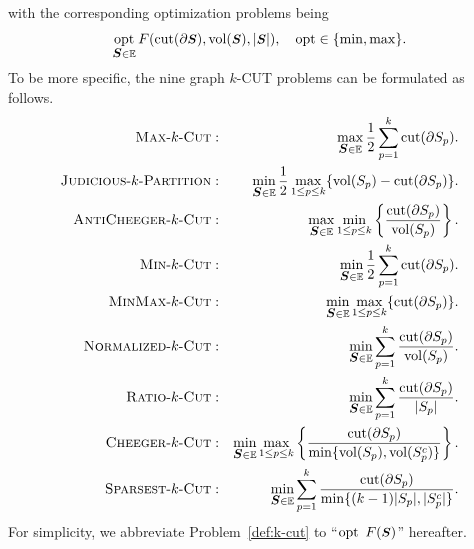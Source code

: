\documentclass[12pt, a4paper]{article}%
\DeclareMathOperator*{\opt}{\ensuremath{opt}}
\renewcommand{\vec}[1]{\mbox{\boldmath \small $#1$}}
\newcommand{\cut}{\mathrm{cut}}
\newcommand{\vol}{\mathrm{vol}}
\numberwithin{equation}{section}
\theoremstyle{plain}
\begin{document}
	with the corresponding optimization problems being 
	\begin{equation}
		\label{def:k-cut}
		\opt\limits_{\vec S\in\mathbb{E}} F(\cut(\partial \vec S),\vol(\vec S),|\vec S|), \quad \opt\in\{\min,\max\}.
	\end{equation}
	To be more specific, the nine graph $k$-CUT problems can be formulated as follows.
	\begin{align}
		\text{\textsc{Max}-$k$-\textsc{Cut}}&:&\max_{\vec S\in\mathbb{E}} \frac{1}{2}\sum_{p=1}^k \cut(\partial S_p).\label{eq::max-k-cut}\\
		\text{\textsc{Judicious}-$k$-\textsc{Partition}}&:&\min_{\vec S\in\mathbb{E}} \frac{1}{2}\max_{1\leq p\leq k} \{\vol(S_p)-\cut(\partial S_p)\}.\label{eq::jp-k-cut}\\
		\text{\textsc{AntiCheeger}-$k$-\textsc{Cut}}&: &\max_{\vec S\in\mathbb{E}}\min_{1\leq p\leq k}\left\{\frac{\cut(\partial S_p)}{\vol(S_p)}\right\}.\label{eq::ah-k-cut}\\
		\text{\textsc{Min}-$k$-\textsc{Cut}}&:&\min_{\vec S\in\mathbb{E}} \frac{1}{2}\sum_{p=1}^k \cut(\partial S_p).\label{eq::min-k-cut}\\
		\text{\textsc{MinMax}-$k$-\textsc{Cut}}&:&\min_{\vec S\in\mathbb{E}} \max_{1\leq p\leq k} \{\cut(\partial S_p)\}.\label{eq::minmax-k-cut}\\
		\text{\textsc{Normalized}-$k$-\textsc{Cut}}&:&\min_{\vec S\in\mathbb{E}}\sum_{p=1}^k \frac{\cut(\partial S_p)}{\vol(S_p)}.\label{eq::normalized-k-cut}\\
		\text{\textsc{Ratio}-$k$-\textsc{Cut}}&:&\min_{\vec S\in\mathbb{E}}\sum_{p=1}^k \frac{\cut(\partial S_p)}{|S_p|}.\label{eq::ratio-k-cut}\\
		\text{\textsc{Cheeger}-$k$-\textsc{Cut}}&:&\min_{\vec S\in\mathbb{E}}\max_{1\leq p\leq k} \left\{\frac{\cut(\partial S_p)}{\min\{\vol(S_p),\vol(S_p^c)\}}\right\}.\label{eq::cheeger}\\
		\text{\textsc{Sparsest}-$k$-\textsc{Cut}}&:&\min_{\vec S\in\mathbb{E}}\sum_{p=1}^k \frac{\cut(\partial S_p)}{\min\{(k-1)|S_p|,|S_p^c|\}}.\label{eq::sparsest}
	\end{align}
	For simplicity, we abbreviate Problem~\eqref{def:k-cut} to ``$\opt\,\, F(\vec S)$'' hereafter.
	
\end{document}
